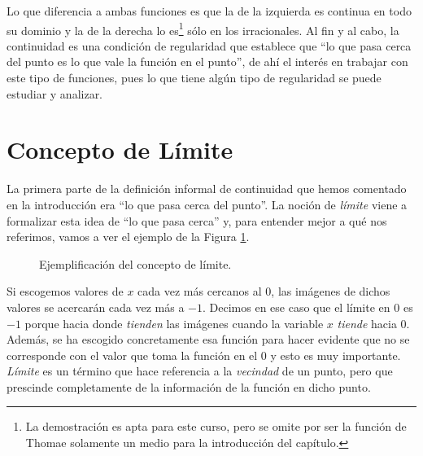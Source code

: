 \documentclass[10pt,a4paper,openright]{book}
\theoremstyle{break}
\begin{document}
Lo que diferencia a ambas funciones es que la de la izquierda es continua en todo su dominio y la de la derecha lo es\footnote{La demostración es apta para este curso, pero se omite por ser la función de Thomae solamente un medio para la introducción del capítulo.} sólo en los irracionales. Al fin y al cabo, la continuidad es una condición de regularidad que establece que ``lo que pasa cerca del punto es lo que vale la función en el punto'', de ahí el interés en trabajar con este tipo de funciones, pues lo que tiene algún tipo de regularidad se puede estudiar y analizar.

\section{Concepto de Límite}
La primera parte de la definición informal de continuidad que hemos comentado en la introducción era ``lo que pasa cerca del punto''. La noción de \textit{límite} viene a formalizar esta idea de ``lo que pasa cerca'' y, para entender mejor a qué nos referimos, vamos a ver el ejemplo de la Figura \ref{fig:ejem_limite}.

\begin{figure}[h]
\centering
{}
\caption{Ejemplificación del concepto de límite.}
\label{fig:ejem_limite}
\end{figure}

Si escogemos valores de $x$ cada vez más cercanos al $0$, las imágenes de dichos valores se acercarán cada vez más a $-1$. Decimos en ese caso que el límite en $0$ es $-1$ porque hacia donde \textit{tienden} las imágenes cuando la variable $x$ \textit{tiende} hacia $0$. Además, se ha escogido concretamente esa función para hacer evidente que no se corresponde con el valor que toma la función en el $0$ y esto es muy importante. \textit{Límite} es un término que hace referencia a la \textit{vecindad} de un punto, pero que prescinde completamente de la información de la función en dicho punto.
\end{document}
